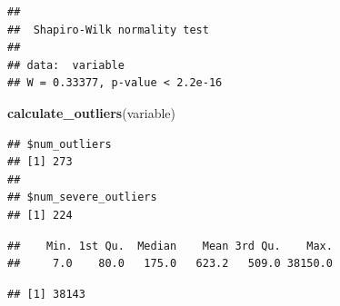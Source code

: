 \documentclass[
]{article}
\newenvironment{Shaded}{\begin{snugshade}}{\end{snugshade}}
\newcommand{\AttributeTok}[1]{\textcolor[rgb]{0.13,0.29,0.53}{#1}}
\newcommand{\DecValTok}[1]{\textcolor[rgb]{0.00,0.00,0.81}{#1}}
\newcommand{\FunctionTok}[1]{\textcolor[rgb]{0.13,0.29,0.53}{\textbf{#1}}}
\newcommand{\NormalTok}[1]{#1}
\newcommand{\OtherTok}[1]{\textcolor[rgb]{0.56,0.35,0.01}{#1}}
\newcommand{\SpecialCharTok}[1]{\textcolor[rgb]{0.81,0.36,0.00}{\textbf{#1}}}
\newcommand{\StringTok}[1]{\textcolor[rgb]{0.31,0.60,0.02}{#1}}
\begin{document}
\begin{verbatim}
## 
##  Shapiro-Wilk normality test
## 
## data:  variable
## W = 0.33377, p-value < 2.2e-16
\end{verbatim}

\begin{Shaded}
\begin{Highlighting}[]
\FunctionTok{calculate\_outliers}\NormalTok{(variable)}
\end{Highlighting}
\end{Shaded}

\begin{verbatim}
## $num_outliers
## [1] 273
## 
## $num_severe_outliers
## [1] 224
\end{verbatim}

\begin{Shaded}
\end{Shaded}

\begin{verbatim}
##    Min. 1st Qu.  Median    Mean 3rd Qu.    Max. 
##     7.0    80.0   175.0   623.2   509.0 38150.0
\end{verbatim}

\begin{Shaded}
\end{Shaded}

\begin{verbatim}
## [1] 38143
\end{verbatim}

\begin{Shaded}
\end{Shaded}
\end{document}
